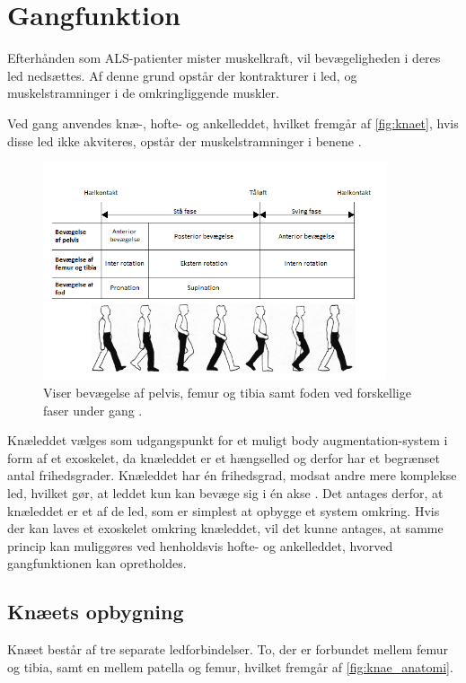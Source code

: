 \section{Gangfunktion}
Efterhånden som ALS-patienter mister muskelkraft, vil bevægeligheden i deres led nedsættes. Af denne grund opstår der kontrakturer i led, og muskelstramninger i de omkringliggende muskler.

Ved gang anvendes knæ-, hofte- og ankelleddet, hvilket fremgår af \autoref{fig:knaet}, hvis disse led ikke akviteres, opstår der muskelstramninger i benene \citep{instforms2008}.

\begin{figure} [H]
\centering
\includegraphics[width=0.9\textwidth]{figures/knaet}
\caption{Viser bevægelse af pelvis, femur og tibia samt foden ved forskellige faser under gang \citep{orthopedics2016}.}
\label{fig:knaet}
\end{figure} 

\noindent
Knæleddet vælges som udgangspunkt for et muligt body augmentation-system i form af et exoskelet, da knæleddet er et hængselled og derfor har et begrænset antal frihedsgrader. Knæleddet har én frihedsgrad, modsat andre mere komplekse led, hvilket gør, at leddet kun kan bevæge sig i én akse \citep{martini2012}. 
Det antages derfor, at knæleddet er et af de led, som er simplest at opbygge et system omkring. 
Hvis der kan laves et exoskelet omkring knæleddet, vil det kunne antages, at samme princip kan muliggøres ved henholdsvis hofte- og ankelleddet, hvorved gangfunktionen kan opretholdes.

\subsection{Knæets opbygning}
Knæet består af tre separate ledforbindelser. To, der er forbundet mellem femur og tibia, samt en mellem patella og femur, hvilket fremgår af \autoref{fig:knae_anatomi}. 

